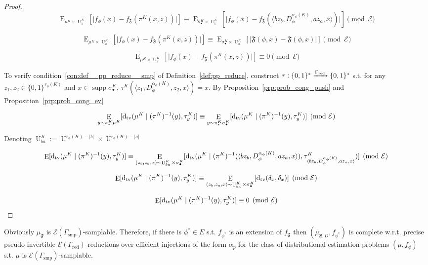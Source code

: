 \documentclass{article}
\numberwithin{equation}{section}
\theoremstyle{definition}
\theoremstyle{plain}
\newcommand{\Bool}{\{0,1\}}
\newcommand{\Words}{{\Bool^*}}
\DeclareMathOperator{\Supp}{supp}
\DeclareMathOperator{\E}{E}
\DeclareMathOperator{\Un}{U}
\newcommand{\Dtv}{\operatorname{d}_{\textnormal{tv}}}
\newcommand{\Abs}[1]{\lvert #1 \rvert}
\newcommand{\Chev}[1]{\langle #1 \rangle}
\newcommand{\Fall}{\mathcal{E}}
\begin{document}
\begin{proof}
\[\E_{\mu^K \times \Un_\pi^K}[\Abs{f_\phi(x)-f_{\mathfrak{F}}(\pi^K(x,z))}] \equiv \E_{\sigma_\bullet^K \times \Un_\pi^K}[\Abs{f_\phi(x)-f_{\mathfrak{F}}(\Chev{bz_b,D_\phi^{\alpha_\phi(K)},az_a,x})}] \pmod{\Fall}\]

\[\E_{\mu^K \times \Un_\pi^K}[\Abs{f_\phi(x)-f_{\mathfrak{F}}(\pi^K(x,z))}] \equiv \E_{\sigma_\bullet^K \times \Un_\pi^K}[\Abs{\mathfrak{F}(\phi,x)-\mathfrak{F}(\phi,x)}] \pmod{\Fall}\]

\[\E_{\mu^K \times \Un_\pi^K}[\Abs{f_\phi(x)-f_{\mathfrak{F}}(\pi^K(x,z))}] \equiv 0 \pmod{\Fall}\]

To verify condition~\ref{con:def__pp_reduce__smp} of Definition~\ref{def:pp_reduce}, construct ${\tau: \Words \xrightarrow{\Gamma_{\textnormal{red}}} \Words}$ s.t. for any\\ ${z_1,z_2 \in \Bool^{r_\phi(K)}}$ and ${x \in \Supp \sigma_\bullet^K}$, ${\tau^K(\Chev{z_1,D_\phi^{\alpha_\phi(K)},z_2,x})=x}$. By Proposition~\ref{prp:prob_cong_push} and Proposition~\ref{prp:prob_cong_ev}

\[\E_{y \sim \pi_*^K\mu^K}[\Dtv(\mu^K \mid (\pi^K)^{-1}(y),\tau_y^K)] \equiv \E_{y \sim \pi_*^K\sigma_\bullet^K}[\Dtv(\mu^K \mid (\pi^K)^{-1}(y),\tau_y^K)] \pmod{\Fall}\]

Denoting ${\Un_{ba}^K:=\Un^{r_\phi(K)-\Abs{b}} \times \Un^{r_\phi(K)-\Abs{a}}}$

\[\E[\Dtv(\mu^K \mid (\pi^K)^{-1}(y),\tau_y^K)] \equiv \E_{(z_b,z_a,x) \sim \Un_{ba}^K \times \sigma_\bullet^K}[\Dtv(\mu^K \mid (\pi^K)^{-1}(\Chev{bz_b,D_\phi^{\alpha_\phi(K)},az_a,x}),\tau_{\Chev{bz_b,D_\phi^{\alpha_\phi(K)},az_a,x}}^K)] \pmod{\Fall}\]

\[\E[\Dtv(\mu^K \mid (\pi^K)^{-1}(y),\tau_y^K)] \equiv \E_{(z_b,z_a,x) \sim \Un_{ba}^K \times \sigma_\bullet^K}[\Dtv(\delta_x,\delta_x)] \pmod{\Fall}\]

\[\E[\Dtv(\mu^K \mid (\pi^K)^{-1}(y),\tau_y^K)] \equiv 0 \pmod{\Fall}\]
%
\end{proof}

Obviously ${\mu_{\mathfrak{F}}}$ is ${\Fall(\Gamma_{\text{smp}})}$-samplable. Therefore, if there is ${\phi^* \in E}$ s.t. ${f_{\phi^*}}$ is an extension of ${f_{\mathfrak{F}}}$ then ${(\mu_{\mathfrak{F},D},f_{\phi^*})}$ is complete w.r.t. precise pseudo-invertible ${\Fall(\Gamma_{\text{red}})}$-reductions over efficient injections of the form ${\alpha_p}$ for the class of distributional estimation problems ${(\mu,f_\phi)}$ s.t. ${\mu}$ is ${\Fall(\Gamma_{\text{smp}})}$-samplable. 
\end{document}
